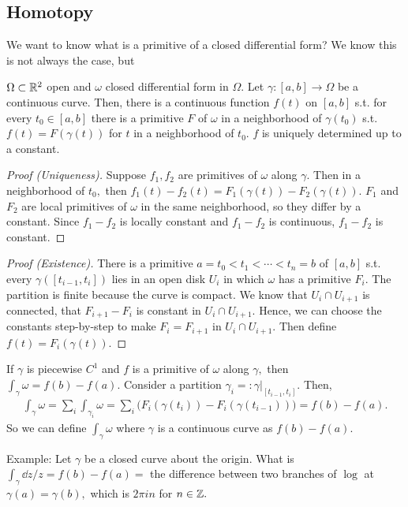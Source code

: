 \documentclass[a4paper,12pt]{article}
\begin{document}
\subsection{Homotopy}
We want to know what is a primitive of a closed differential form? We know this is not always the case, but \begin{proposition}
    $\Omega\subset\mathbb{R}^2$ open and $\omega$ closed differential form in $\Omega.$ Let $\gamma:[a,b]\to\Omega$ be a continuous curve. Then, there is a continuous function $f(t)$ on $[a,b]$ s.t. for every $t_0\in[a,b]$ there is a primitive $F$ of $\omega$ in a neighborhood of $\gamma(t_0)$ s.t. $f(t)=F(\gamma(t))$ for $t$ in a neighborhood of $t_0.$ $f$ is uniquely determined up to a constant.
    \begin{proof}[Proof (Uniqueness)]
        Suppose $f_1,f_2$ are primitives of $\omega$ along $\gamma.$ Then in a neighborhood of $t_0,$ then $f_1(t)-f_2(t)=F_1(\gamma(t))-F_2(\gamma(t)).$ $F_1$ and $F_2$ are local primitives of $\omega$ in the same neighborhood, so they differ by a constant. Since $f_1-f_2$ is locally constant and $f_1-f_2$ is continuous, $f_1-f_2$ is constant.
    \end{proof}
    \begin{proof}[Proof (Existence)]
        There is a primitive $a=t_0<t_1<\cdots<t_n=b$ of $[a,b]$ s.t. every $\gamma([t_{i-1},t_i])$ lies in an open disk $U_i$ in which $\omega$ has a primitive $F_i.$ The partition is finite because the curve is compact. We know that $U_i\cap U_{i+1}$ is connected, that $F_{i+1}-F_i$ is constant in $U_i\cap U_{i+1}$. Hence, we can choose the constants step-by-step to make $F_i=F_{i+1}$ in $U_i\cap U_{i+1}.$ Then define $f(t)=F_i(\gamma(t)).$
    \end{proof}
\end{proposition}

If $\gamma$ is piecewise $C^1$ and $f$ is a primitive of $\omega$ along $\gamma,$ then $\int_\gamma\omega=f(b)-f(a).$ Consider a partition $\gamma_i=:\gamma|_{[t_{i-1},t_i]}.$ Then, \begin{align}
    \int_\gamma\omega=\sum_i\int_{\gamma_i}\omega=\sum_i\big(F_i(\gamma(t_i))-F_i(\gamma(t_{i-1}))\big)=f(b)-f(a).
\end{align}
So we can define $\int_\gamma\omega$ where $\gamma$ is a continuous curve as $f(b)-f(a).$

Example: Let $\gamma$ be a closed curve about the origin. What is $\int_\gamma\dd z/z=f(b)-f(a)=$ the difference between two branches of $\log$ at $\gamma(a)=\gamma(b),$ which is $2\pi in$ for $n\in\mathbb{Z}.$
\end{document}
